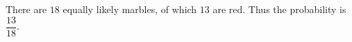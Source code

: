 There are $18$ equally likely marbles, of which $13$ are red. Thus the probability is $\boxed{\dfrac{13}{18}}$.
